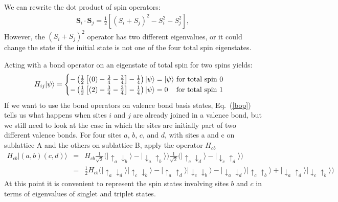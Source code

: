 We can rewrite the dot product of spin operators:
\begin{eqnarray}
\mathbf{S}_i\cdot \mathbf{S}_j = \tfrac{1}{2}\left[ \left(S_i + S_j\right)^2 -S_i^2-S_j^2 \right],
\end{eqnarray}
However, the $\left(S_i + S_j\right)^2$ 
operator has two different eigenvalues, or it could change the state
if the initial state is not one of the four total spin eigenstates.

Acting with a bond operator on an eigenstate of total spin for two spins yields:
\begin{equation}
H_{ij}\lvert \psi \rangle = \begin{cases}
	-\left(\tfrac{1}{2} \left[(0) - \tfrac{3}{4} - \tfrac{3}{4}\right] -\tfrac{1}{4}\right)\lvert\psi\rangle 
	= \lvert\psi\rangle \text{ for total spin 0}\\
	 -\left(\tfrac{1}{2} \left[(2) - \tfrac{3}{4}- \tfrac{3}{4}\right]-\tfrac{1}{4}\right)\lvert\psi\rangle
	 = 0 \text{ \;\;\;for total spin 1}
	 \end{cases}
	 \label{bop}
\end{equation}
If we want to use the bond operators on valence bond basis states, Eq.~(\ref{bop}) tells
us what happens when sites $i$ and $j$ are already joined in a valence bond, but we still
need to look at the case in which the sites are initially part of two different valence bonds.
For four sites $a$, $b$, $c$, and $d$, with sites a and c on sublattice A 
and the others on sublattice B,
apply the operator $H_{cb}$
\begin{eqnarray}
H_{cb}\lvert(a,b)(c,d)\rangle &=& H_{cb}
	\tfrac{1}{\sqrt{2}} \big( 
	\lvert \uparrow_a \downarrow_b \rangle - \lvert \downarrow_a \uparrow_b \rangle 
	\big) 
	\tfrac{1}{\sqrt{2}} \big( 
	\lvert \uparrow_c \downarrow_d \rangle - \lvert \downarrow_c \uparrow_d \rangle 
	\big) \nonumber \\ 
	&=&
	  \tfrac{1}{2} H_{cb} \big(
	   \lvert\uparrow_a \downarrow_d\rangle \lvert \uparrow_c \downarrow_b \rangle
	   - \lvert \uparrow_a \uparrow_d \rangle \lvert \downarrow_c \downarrow_b \rangle
	   - \lvert \downarrow_a \downarrow_d \rangle \lvert \uparrow_c \uparrow_b \rangle
	   + \lvert \downarrow_a \uparrow_d \rangle \lvert \downarrow_c \uparrow_b \rangle
	   \big) \nonumber
\end{eqnarray}
At this point it is convenient to represent the spin states involving sites $b$ and $c$
in terms of eigenvalues of singlet and triplet states.
